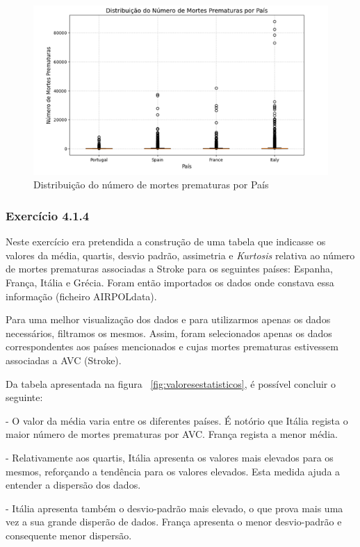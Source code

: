 \documentclass[conference]{IEEEtran}
\begin{document}
\begin{figure}
	\centering
	\includegraphics[width=0.9\linewidth]{mortes_prematuras}
	\caption{Distribuição do número de mortes prematuras por País}
	\label{fig:mortesprematuras}
\end{figure}


\medskip
\subsubsection{\textbf{Exercício 4.1.4}}

Neste exercício era pretendida a construção de uma tabela que indicasse os valores da média, quartis, desvio padrão, assimetria e \textit{Kurtosis} relativa ao número de mortes prematuras associadas a Stroke para os seguintes países: Espanha, França, Itália e Grécia. Foram então importados os dados onde constava essa informação (ficheiro AIRPOLdata). 
 
Para uma melhor visualização dos dados e para utilizarmos apenas os dados necessários, filtramos os mesmos. Assim, foram selecionados apenas os dados correspondentes aos países mencionados e cujas mortes prematuras estivessem associadas a AVC (Stroke). 

Da tabela apresentada na figura \figurename~\ref{fig:valoresestatisticos}, é possível concluir o seguinte:

- O valor da média varia entre os diferentes países. É notório que Itália regista o maior número de mortes prematuras por AVC. França regista a menor média.

- Relativamente aos quartis, Itália apresenta os valores mais elevados para os mesmos, reforçando a tendência para os valores elevados. Esta medida ajuda a entender a dispersão dos dados.

- Itália apresenta também o desvio-padrão mais elevado, o que prova mais uma vez a sua grande disperão de dados. França apresenta o menor desvio-padrão e consequente menor dispersão.
\end{document}
